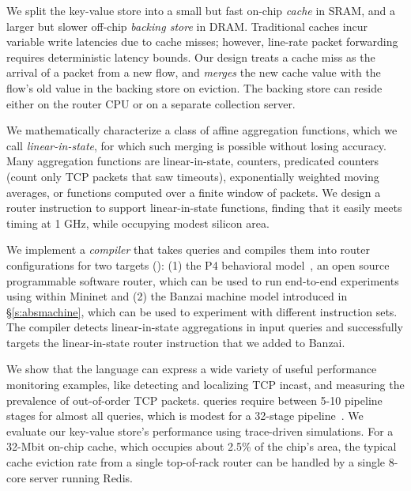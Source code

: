 We split the key-value store into a small but fast on-chip {\em cache} in SRAM,
and a larger but slower off-chip {\em backing store} in DRAM. Traditional caches
incur variable write latencies due to cache misses; however, line-rate packet
forwarding requires deterministic latency bounds. Our design treats a cache miss
as the arrival of a packet from a new flow, and {\em merges} the new cache value
with the flow's old value in the backing store on eviction. The backing
store can reside either on the router CPU or on a separate collection server.

We mathematically characterize a class of affine aggregation functions, which we call {\em
  linear-in-state}, for which
such merging is possible without losing accuracy. Many aggregation functions are
linear-in-state, \eg counters, predicated counters (\eg count only TCP packets
that saw timeouts), exponentially weighted moving averages, or functions
computed over a finite window of packets.  We design a router instruction to
support linear-in-state functions, finding that it easily meets
timing at 1 GHz, while occupying modest silicon area.

 We implement a {\em compiler} that takes \TheSystem
queries and compiles them into router configurations for two targets
(): (1) the P4 behavioral model~\cite{p4-bmv2}, an open source
programmable software router, which can be used to run end-to-end experiments
using \TheSystem within Mininet and (2) the Banzai machine model introduced in
\S\ref{s:absmachine}, which can be used to experiment with
different instruction sets.  The \TheSystem compiler detects linear-in-state
aggregations in input queries and successfully targets the linear-in-state router
instruction that we added to Banzai.

We show that the \TheSystem language can express a wide variety of useful
performance monitoring examples, like detecting and localizing TCP incast, and
measuring the prevalence of out-of-order TCP packets. \TheSystem queries require
between 5-10 pipeline stages for almost all queries, which is modest for a
32-stage pipeline~\cite{rmt}. We evaluate our key-value store's performance
using trace-driven simulations. For a 32-Mbit on-chip cache, which occupies
about 2.5\% of the chip's area, the typical cache eviction rate from a single
top-of-rack router can be handled by a single 8-core server running
Redis.
